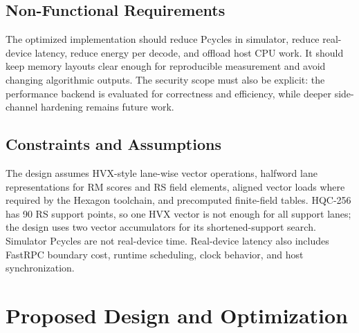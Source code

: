\documentclass[12pt,a4paper]{report}
\begin{document}
\section{Non-Functional Requirements}
The optimized implementation should reduce Pcycles in simulator, reduce real-device latency, reduce energy per decode, and offload host CPU work. It should keep memory layouts clear enough for reproducible measurement and avoid changing algorithmic outputs. The security scope must also be explicit: the performance backend is evaluated for correctness and efficiency, while deeper side-channel hardening remains future work.

\section{Constraints and Assumptions}
The design assumes HVX-style lane-wise vector operations, halfword lane representations for RM scores and RS field elements, aligned vector loads where required by the Hexagon toolchain, and precomputed finite-field tables. HQC-256 has 90 RS support points, so one HVX vector is not enough for all support lanes; the design uses two vector accumulators for its shortened-support search. Simulator Pcycles are not real-device time. Real-device latency also includes FastRPC boundary cost, runtime scheduling, clock behavior, and host synchronization.

\chapter{Proposed Design and Optimization}
\label{chap:design}
\end{document}
